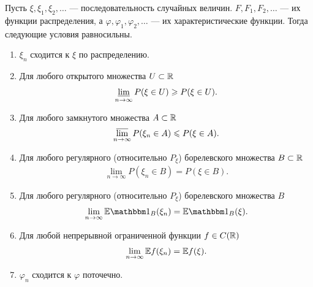 \documentclass[../main.tex]{subfiles}
\begin{document}
\begin{thm}
 Пусть $ \xi, \xi_1, \xi_2, \ldots $ --- последовательность случайных величин. $ F, F_1, F_2, \ldots $ --- их функции распределения, а $ \varphi, \varphi_1, \varphi_2, \ldots $ --- их характеристические функции. Тогда следующие условия равносильны.
 \begin{enumerate}
  \item $ \xi_n $ сходится к $ \xi $ по распределению.
  \item Для любого открытого множества $ U \subset \mathbb{R} $
   \begin{align*}
    \varliminf_{n \to \infty} P(\xi \in U) \geqslant P(\xi \in U).
   \end{align*}
  \item Для любого замкнутого множества $ A \subset \mathbb{R} $
   \begin{align*}
    \varlimsup_{n \to \infty} P(\xi_n \in A) \leqslant P(\xi \in A).
   \end{align*}
  \item Для любого регулярного (относительно $ P_\xi $) борелевского множества $ B \subset \mathbb{R}$
   \begin{align*}
    \lim_{n \to \infty} P(\xi_n \in B) = P(\xi \in B).
   \end{align*}
  \item Для любого регулярного (относительно $ P_\xi $) борелевского множества $ B $
   \begin{align*}
    \lim_{n \to \infty} \E \Ind_B(\xi_n) = \E \Ind_B(\xi).
   \end{align*}
  \item Для любой непрерывной ограниченной функции $ f \in C(\mathbb{R}) $
   \begin{align*}
    \lim_{n \to \infty} \mathbb E f(\xi_n) = \mathbb E f(\xi).
   \end{align*}
  \item $ \varphi_n $ сходится к $ \varphi $ поточечно.
 \end{enumerate}
\end{thm}
\end{document}
